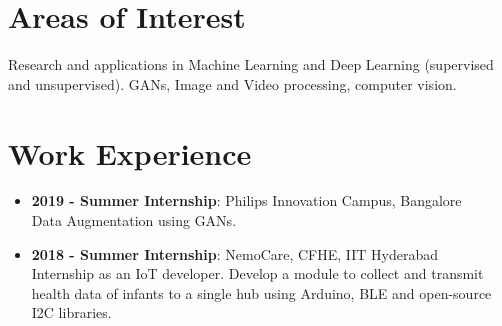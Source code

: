\documentclass[10pt]{report} %
\newlength\myheight
\newlength\mydepth
\begin{document}




\hline 

\section{Areas of Interest}
Research and applications in Machine Learning and Deep Learning (supervised and unsupervised). GANs, Image and Video processing, computer vision. 

\vspace{3mm}
\hline

\section{Work Experience}
\begin{itemize}
    \item \textbf{2019 - Summer Internship}: Philips Innovation Campus, Bangalore \\
    Data Augmentation using GANs.
    \item \textbf{2018 - Summer Internship}: NemoCare, CFHE, IIT Hyderabad \\
    Internship as an IoT developer. Develop a module to collect and transmit health data of infants to a single hub using Arduino, BLE and open-source I2C libraries. 
    
\end{itemize}
\end{document}
